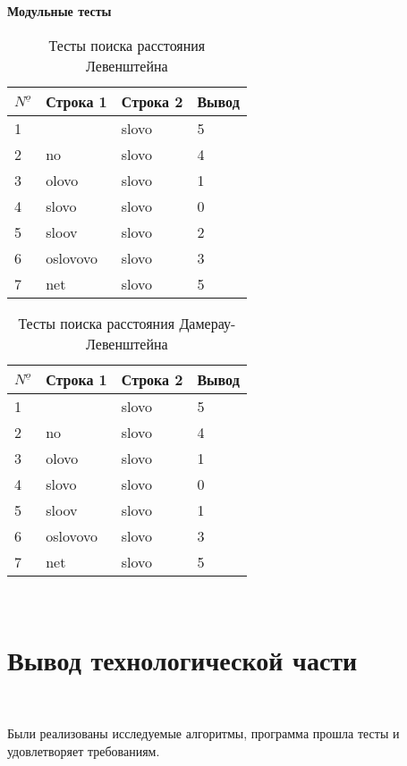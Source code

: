 \textbf{Модульные тесты}


\begin{table}[ht]
    \caption{Тесты поиска расстояния Левенштейна}
\begin{tabular}{ l | l | l | l }
    ${N^{\underline{o}}}$ & Строка 1 & Строка 2 & Вывод  \\ \hline
    1 &  & slovo & 5\\
    2 & no & slovo & 4\\
    3 & olovo & slovo & 1\\
    4 & slovo & slovo & 0\\
    5 & sloov & slovo & 2\\
    6 & oslovovo & slovo & 3\\
    7 & net & slovo & 5\\
\end{tabular}
\label{tab:levenstein}
\end{table}


\begin{table}[ht]
    \caption{Тесты поиска расстояния Дамерау-Левенштейна}
    \begin{tabular}{ l | l | l | l }
        ${N^{\underline{o}}}$ & Строка 1 & Строка 2 & Вывод  \\ \hline
        1 &  & slovo & 5\\
        2 & no & slovo & 4\\
        3 & olovo & slovo & 1\\
        4 & slovo & slovo & 0\\
        5 & sloov & slovo & 1\\
        6 & oslovovo & slovo & 3\\
        7 & net & slovo & 5\\
    \end{tabular}\label{tab:dameraylevenstein}
\end{table}


~\section{Вывод технологической части}\label{TechResults}~

Были реализованы исследуемые алгоритмы, программа прошла тесты и удовлетворяет требованиям.

